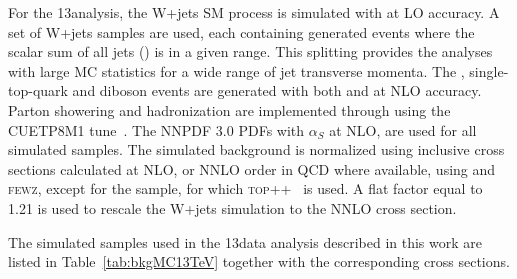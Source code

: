 For the 13\TeV analysis, the W+jets SM process is simulated with \amcatnlo{} at LO accuracy.
A set of W+jets samples are used, each containing generated events where the scalar \pt sum of all jets (\HT) is in a given range.
This splitting provides the analyses with large MC statistics for a wide range of jet transverse momenta.
The \ttbar, single-top-quark and diboson events are generated with both \POWHEG{} and \amcatnlo{} at NLO accuracy.
Parton showering and hadronization are implemented through  using the CUETP8M1 tune~\cite{Skands:2014pea,Khachatryan:2015pea}.
The NNPDF 3.0 PDFs with $\alpha_S$ at NLO, are used for all simulated samples. 
The simulated background is normalized using inclusive cross sections calculated at NLO, or NNLO order in QCD where available, using \MCFM{} and \textsc{fewz},
except for the \ttbar sample, for which \textsc{top++}~\cite{Czakon:2011xx} is used.
A flat factor equal to 1.21 is used to rescale the W+jets simulation to the NNLO cross section.

The simulated samples used in the 13\TeV data analysis described in this work are listed in Table~\ref{tab:bkgMC13TeV} together with the corresponding cross sections.

